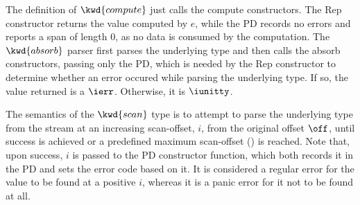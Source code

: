 The definition of $\kwd{compute}$ just calls the compute constructors. The
Rep constructor returns the value computed by
$e$, while the PD records no errors and reports a span of
length 0, as no data is consumed by the computation. The $\kwd{absorb}$
parser first parses the underlying type and then calls the absorb
constructors, passing only the PD, which is needed by the
Rep constructor to determine whether an error occured while
parsing the underlying type. If so, the value returned is a
$\ierr$. Otherwise, it is $\iunitty$.

The semantics of the $\kwd{scan}$ type is to attempt to parse the underlying
type from the stream at an increasing scan-offset, $i$, from the original
offset $\off$,  until success is achieved
or a predefined maximum scan-offset () is reached. Note
that, upon success, $i$ is passed to the PD constructor function,
which both records it in the PD and sets the error code based on
it. It is considered a regular error for the value to be found at a
positive $i$, whereas it is a panic error for it not to be found at
all.

